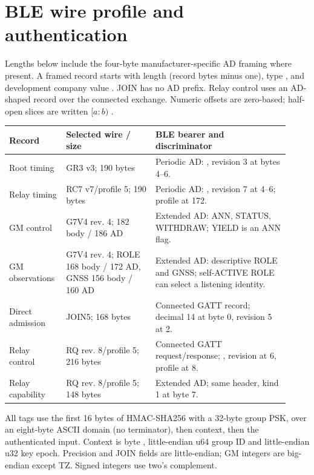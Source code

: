 \documentclass[11pt,letterpaper]{article}
\begin{document}
\page
\section{BLE wire profile and authentication}
Lengths below include the four-byte manufacturer-specific AD framing where present. A framed record starts with length (record bytes minus one), type , and development company value . JOIN has no AD prefix. Relay control uses an AD-shaped record over the connected exchange. Numeric offsets are zero-based; half-open slices are written $[a:b)$ \cite{wire,tz}.

\begin{center}\small
\begin{tabular}{@{}L{0.17\linewidth}L{0.30\linewidth}L{0.45\linewidth}@{}}\toprule
Record & Selected wire / size & BLE bearer and discriminator\\\midrule
Root timing & GR3 v3; 190 bytes & Periodic AD: , revision 3 at bytes 4--6.\\
Relay timing & RC7 v7/profile 5; 190 bytes & Periodic AD: , revision 7 at 4--6; profile at 172.\\
GM control & G7V4 rev. 4; 182 body / 186 AD & Extended AD: ANN, STATUS, WITHDRAW; YIELD is an ANN flag.\\
GM observations & G7V4 rev. 4; ROLE 168 body / 172 AD, GNSS 156 body / 160 AD & Extended AD: descriptive ROLE and GNSS; self-ACTIVE ROLE can select a listening identity.\\
Direct admission & JOIN5; 168 bytes & Connected GATT record; decimal 14 at byte 0, revision 5 at 2.\\
Relay control & RQ rev. 8/profile 5; 216 bytes & Connected GATT request/response; , revision at 6, profile at 8.\\
Relay capability & RQ rev. 8/profile 5; 148 bytes & Extended AD; same header, kind 1 at byte 7.\\
\bottomrule\end{tabular}\end{center}

All tags use the first 16 bytes of HMAC-SHA256 with a 32-byte group PSK, over an eight-byte ASCII domain (no terminator), then context, then the authenticated input. Context is byte , little-endian u64 group ID and little-endian u32 key epoch. Precision and JOIN fields are little-endian; GM integers are big-endian except TZ. Signed integers use two's complement.
\end{document}
